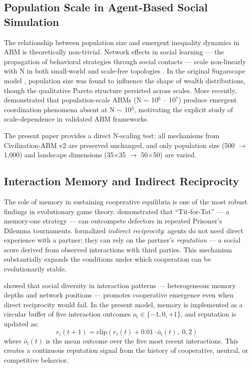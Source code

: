 \documentclass[12pt, letterpaper]{article}
\begin{document}
\subsection{Population Scale in Agent-Based Social Simulation}

The relationship between population size and emergent inequality
dynamics in ABM is theoretically non-trivial. Network effects in
social learning --- the propagation of behavioral strategies through
social contacts --- scale non-linearly with N in both small-world and
scale-free topologies \citep{watts1998, barabasi1999}. In the original
Sugarscape model \citep{epstein1996}, population size was found to
influence the shape of wealth distributions, though the qualitative
Pareto structure persisted across scales. More recently,
\citet{chopra2024agenttorch} demonstrated that population-scale ABMs
(N $\sim$ 10$^6$ -- 10$^7$) produce emergent coordination phenomena
absent at N $\sim$ 10$^3$, motivating the explicit study of
scale-dependence in validated ABM frameworks.

The present paper provides a direct N-scaling test: all mechanisms
from Civilization-ABM v2 are preserved unchanged, and only population
size (500 $\to$ 1,000) and landscape dimensions
(35$\times$35 $\to$ 50$\times$50) are varied.

\subsection{Interaction Memory and Indirect Reciprocity}

The role of memory in sustaining cooperative equilibria is one of the
most robust findings in evolutionary game theory. \citet{axelrod1984}
demonstrated that ``Tit-for-Tat'' --- a memory-one strategy --- can
outcompete defectors in repeated Prisoner's Dilemma tournaments.
\citet{nowak1998indirect} formalized \emph{indirect reciprocity}: agents
do not need direct experience with a partner; they can rely on the
partner's \emph{reputation} --- a social score derived from observed
interactions with third parties. This mechanism substantially expands
the conditions under which cooperation can be evolutionarily stable.

\citet{santos2008social} showed that social diversity in interaction
patterns --- heterogeneous memory depths and network positions ---
promotes cooperative emergence even when direct reciprocity would fail.
In the present model, memory is implemented as a circular buffer of five
interaction outcomes $o_t \in \{-1, 0, +1\}$, and reputation is updated
as:
\begin{equation}
  r_i(t+1) = \text{clip}\!\left(r_i(t) + 0.01 \cdot
    \bar{o}_i(t),\; 0, 2\right)
\end{equation}
where $\bar{o}_i(t)$ is the mean outcome over the five most recent
interactions. This creates a continuous reputation signal from the
history of cooperative, neutral, or competitive behavior.
\end{document}
